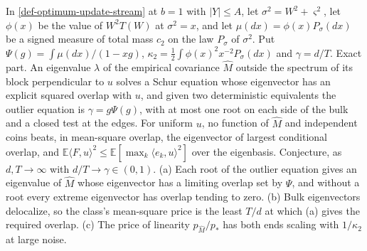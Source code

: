 \begin{conjecture}
In \cref{def-optimum-update-stream} at $b=1$ with $\lvert Y\rvert\le A$, let
$\sigma^2=W^2+\varsigma^2$, let $\phi(x)$ be the value of $W^2T(W)$ at $\sigma^2=x$,
and let $\mu(dx)=\phi(x)P_\sigma(dx)$ be a signed measure of total mass $c_2$ on the law
$P_\sigma$ of $\sigma^2$. Put $\Psi(g)=\int\mu(dx)/(1-xg)$,
$\kappa_2=\frac12\int\phi(x)^2x^{-2}P_\sigma(dx)$ and $\gamma=d/T$. Exact part. An
eigenvalue $\lambda$ of the empirical covariance $\hat M$ outside the spectrum of its
block perpendicular to $u$ solves a Schur equation whose eigenvector has an explicit
squared overlap with $u$, and given two deterministic equivalents the outlier equation
is $\gamma=g\Psi(g)$, with at most one root on each side of the bulk and a closed test
at the edges. For uniform $u$, no function of $\hat M$ and independent coins beats, in
mean-square overlap, the eigenvector of largest conditional overlap, and
$\mathbb E\langle F,u\rangle^2\le\mathbb E[\max_k\langle e_k,u\rangle^2]$ over the
eigenbasis. Conjecture, as $d,T\to\infty$ with $d/T\to\gamma\in(0,1)$. (a) Each root of
the outlier equation gives an eigenvalue of $\hat M$ whose eigenvector has a limiting
overlap set by $\Psi$, and without a root every extreme eigenvector has overlap
tending to zero. (b) Bulk eigenvectors delocalize, so the class's mean-square price is
the least $T/d$ at which (a) gives the required overlap. (c) The price of linearity
$p_{\hat M}/p_*$ has both ends scaling with $1/\kappa_2$ at large noise.
\end{conjecture}
